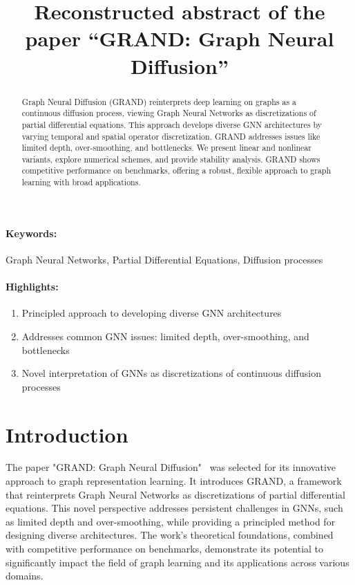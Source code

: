 \documentclass[12pt]{article}
\title{Reconstructed abstract of the paper ``GRAND: Graph Neural Diffusion''}
\date{}
\begin{document}
\maketitle

\begin{abstract}
Graph Neural Diffusion (GRAND) reinterprets deep learning on graphs as a continuous diffusion process, viewing Graph Neural Networks as discretizations of partial differential equations. This approach develops diverse GNN architectures by varying temporal and spatial operator discretization. GRAND addresses issues like limited depth, over-smoothing, and bottlenecks. We present linear and nonlinear variants, explore numerical schemes, and provide stability analysis. GRAND shows competitive performance on benchmarks, offering a robust, flexible approach to graph learning with broad applications.
\end{abstract}
\paragraph{Keywords:} Graph Neural Networks, Partial Differential Equations, Diffusion processes 

\paragraph{Highlights:}
\begin{enumerate}
\item Principled approach to developing diverse GNN architectures
\item Addresses common GNN issues: limited depth, over-smoothing, and bottlenecks
\item Novel interpretation of GNNs as discretizations of continuous diffusion processes
\end{enumerate}

\section{Introduction}
The paper "GRAND: Graph Neural Diffusion"~\cite{unknown} was selected for its innovative approach to graph representation learning. It introduces GRAND, a framework that reinterprets Graph Neural Networks as discretizations of partial differential equations. This novel perspective addresses persistent challenges in GNNs, such as limited depth and over-smoothing, while providing a principled method for designing diverse architectures. The work's theoretical foundations, combined with competitive performance on benchmarks, demonstrate its potential to significantly impact the field of graph learning and its applications across various domains.



\end{document}
